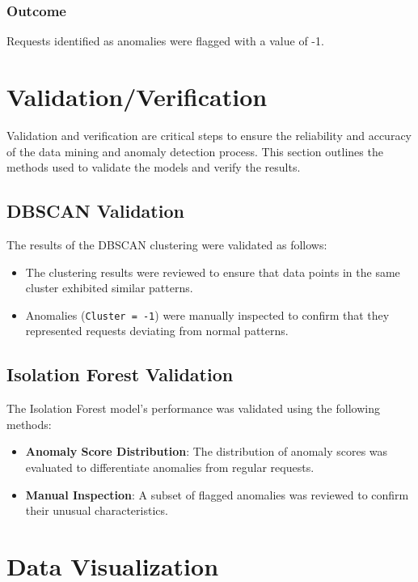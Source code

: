 \subsubsection{Outcome}
Requests identified as anomalies were flagged with a value of -1.

\section{Validation/Verification}
Validation and verification are critical steps to ensure the reliability and accuracy of the data mining and anomaly detection process. This section outlines the methods used to validate the models and verify the results.

\subsection{DBSCAN Validation}
The results of the DBSCAN clustering were validated as follows:
\begin{itemize}
	\item The clustering results were reviewed to ensure that data points in the same cluster exhibited similar patterns.
	\item Anomalies (\texttt{Cluster = -1}) were manually inspected to confirm that they represented requests deviating from normal patterns.
\end{itemize}

\subsection{Isolation Forest Validation}
The Isolation Forest model's performance was validated using the following methods:
\begin{itemize}
	\item \textbf{Anomaly Score Distribution}: The distribution of anomaly scores was evaluated to differentiate anomalies from regular requests.
	\item \textbf{Manual Inspection}: A subset of flagged anomalies was reviewed to confirm their unusual characteristics.
\end{itemize}

\section{Data Visualization}

